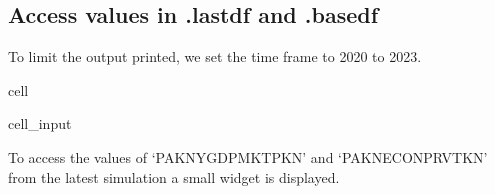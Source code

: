 \documentclass[letterpaper,10pt,english]{jupyterBook}
\begin{document}
\subsection{Access values in .lastdf and .basedf}
\label{\detokenize{content/Python/modelflow_features:access-values-in-lastdf-and-basedf}}
\sphinxAtStartPar
To limit the output printed, we set the time frame to 2020 to 2023.

\begin{sphinxuseclass}{cell}\begin{sphinxVerbatimInput}

\begin{sphinxuseclass}{cell_input}
\begin{sphinxVerbatim}[commandchars=\\\{\}]
\end{sphinxVerbatim}

\end{sphinxuseclass}\end{sphinxVerbatimInput}

\end{sphinxuseclass}
\sphinxAtStartPar
To access the values of ‘PAKNYGDPMKTPKN’ and ‘PAKNECONPRVTKN’ from the latest simulation a small widget is displayed.
\end{document}

